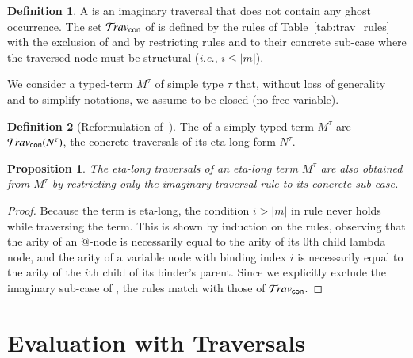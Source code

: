 \documentclass{elsarticle}
\makeatletter
\theoremstyle{plain}
\newtheorem{proposition}[theorem]{Proposition}
\theoremstyle{definition}
\newtheorem{definition}{Definition}[section]
\newcommand{\ghostvar}{\mathsf{x\mkern-5mu x}}
\newcommand{\concrete}{{\sf con}}
\renewcommand\ie{{\it i.e.\@\xspace}}
\makeatother
\begin{document}
\begin{definition}
\label{def:concrete_traversals}
A  is an imaginary traversal that does not contain
any ghost occurrence.
%
The set $\travset_\concrete$ of 
is defined by the rules of Table~\ref{tab:trav_rules}
with the exclusion of \rulenamet{Lam^\ghostvar} and by restricting rules  and  to their concrete sub-case where the traversed node must be structural (\ie, $i\leq|m|$).
\end{definition}

We consider a typed-term $M^\tau$ of simple type $\tau$ that, without loss of generality and to simplify notations, we assume to be closed (no free variable).

\begin{definition}[Reformulation of~\cite{BlumPhd}]
The  of a simply-typed term $M^\tau$ are
$\travset_{\concrete}(N^\tau)$, the concrete traversals of its eta-long form $N^\tau$.
\end{definition}

\begin{proposition}
\label{prop:ulc_and_stlc_trav_coincide}
The eta-long traversals of an eta-long term $M^\tau$ are also obtained from
$M^\tau$ by restricting only the imaginary traversal rule  to its concrete sub-case.
\end{proposition}
\begin{proof}
Because the term is eta-long, the condition $i>|m|$ in rule  never holds while traversing the term. This is shown by induction on the rules, observing that the arity of an $@$-node is necessarily equal to the arity of its $0$th child lambda node, and the arity of a variable node with binding index $i$ is necessarily equal to the arity of the $i$th child of its binder's parent.
Since we explicitly exclude the imaginary sub-case of , the rules match with those of $\travset_\concrete$.
\end{proof}


\section{Evaluation with Traversals}
\label{sec:normalizing_trav}
\end{document}
